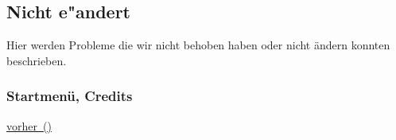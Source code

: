 %



\newpage



\subsection{Nicht e{"a}ndert}
\label{Abschnitt:Aenderungen:Protokoll:Nicht_behobene_Probleme}

Hier werden Probleme die wir nicht behoben haben oder nicht ändern konnten beschrieben.





\subsubsection*{Startmenü, Credits}
\label{Abschnitt:Aenderungen:Protokoll:Startmenue}


\hyperref[Abb:Aenderungen:Startmenue_(vorher)]{vorher~(\mousecursor)}




